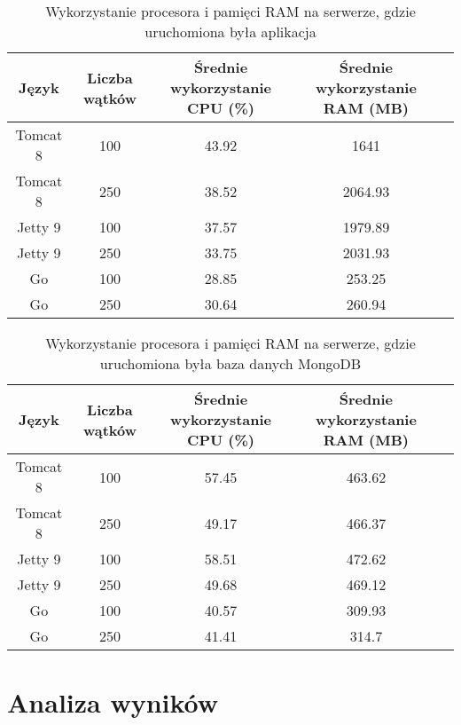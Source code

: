  \begin{table}[!htb]
 \centering
 \caption{Wykorzystanie procesora i pamięci RAM na serwerze, gdzie uruchomiona była aplikacja}
 \label{tab:app-full-all}
 \begin{tabular}{@{}ccccl@{}}
 \toprule
 \textbf{Język} & \textbf{Liczba wątków} & \multicolumn{1}{p{3cm}}{\textbf{Średnie wykorzystanie CPU (\%)}} & \multicolumn{1}{p{3cm}}{\textbf{Średnie wykorzystanie RAM (MB)}} &  \\ \midrule
 Tomcat 8       & 100                    & 43.92                             & 1641                          &  \\
 Tomcat 8       & 250                    & 38.52                             & 2064.93                          &  \\
 Jetty 9       & 100                    & 37.57                             & 1979.89                          &  \\
 Jetty 9       & 250                    & 33.75                             & 2031.93                          &  \\
 Go       & 100                    & 28.85                             & 253.25                          &  \\
 Go       & 250                    & 30.64                             & 260.94                          &  \\
 \bottomrule
 \end{tabular}
 \end{table}


 \begin{table}[!htb]
 \centering
 \caption{Wykorzystanie procesora i pamięci RAM na serwerze, gdzie uruchomiona była baza danych MongoDB}
 \label{tab:mongo-full-all}
 \begin{tabular}{@{}ccccl@{}}
 \toprule
 \textbf{Język} & \textbf{Liczba wątków} & \multicolumn{1}{p{3cm}}{\textbf{Średnie wykorzystanie CPU (\%)}} & \multicolumn{1}{p{3cm}}{\textbf{Średnie wykorzystanie RAM (MB)}} &  \\ \midrule
 Tomcat 8       & 100                    & 57.45                             & 463.62                          &  \\
 Tomcat 8       & 250                    & 49.17                             & 466.37                          &  \\
 Jetty 9       & 100                    & 58.51                             & 472.62                          &  \\
 Jetty 9       & 250                    & 49.68                             & 469.12                          &  \\
 Go       & 100                    & 40.57                             & 309.93                          &  \\
 Go       & 250                    & 41.41                             & 314.7                          &  \\
 \bottomrule
 \end{tabular}
 \end{table}

 \section{Analiza wyników}
